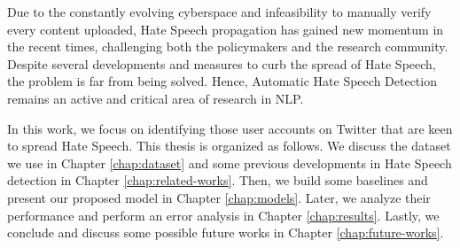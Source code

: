 




Due to the constantly evolving cyberspace and infeasibility to manually verify every content uploaded, Hate Speech propagation has gained new momentum in the recent times, challenging both the policymakers and the research community. Despite several developments and measures to curb the spread of Hate Speech, the problem is far from being solved. Hence, Automatic Hate Speech Detection remains an active and critical area of research in NLP.

In this work, we focus on identifying those user accounts on Twitter that are keen to spread Hate Speech.
This thesis is organized as follows.
We discuss the dataset we use in Chapter \ref{chap:dataset} and some previous developments in Hate Speech detection in Chapter \ref{chap:related-works}. Then, we build some baselines and present our proposed model in Chapter \ref{chap:models}. Later, we analyze their performance and perform an error analysis in Chapter \ref{chap:results}. Lastly, we conclude and discuss some possible future works in Chapter \ref{chap:future-works}.




